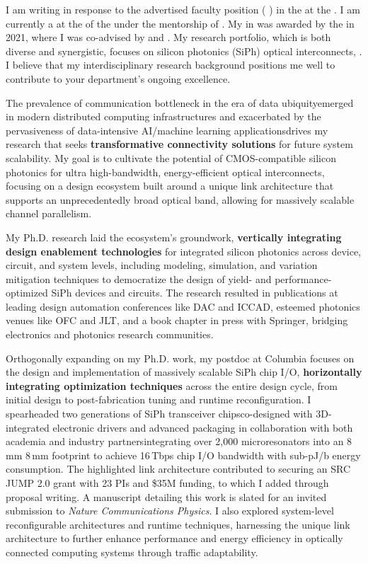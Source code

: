 I am writing in response to the advertised faculty position (\textbf{\appPosition{} \appJobID}) in the \appDept{} at the \appSchool{}. I am currently a \myTitle{} at the \myDept{} of the \mySchoolShort{} under the mentorship of \mySuper{}. My \myDegree{} in \myMajor{} was awarded by the \myPhDSchool{} in 2021, where I was co-advised by \myAdvisor{} and \myCoAdvisor{}. My research portfolio, which is both diverse and synergistic, focuses on silicon photonics (SiPh) optical interconnects, \appSpecific{}. I believe that my interdisciplinary research background positions me well to contribute to your department's ongoing excellence.

The prevalence of communication bottleneck in the era of data ubiquity\textemdash emerged in modern distributed computing infrastructures and exacerbated by the pervasiveness of data-intensive AI/machine learning applications\textemdash drives my research that seeks \textbf{transformative connectivity solutions} for future system scalability. My goal is to cultivate the potential of CMOS-compatible silicon photonics for ultra high-bandwidth, energy-efficient optical interconnects, focusing on a design ecosystem built around a unique link architecture that supports an unprecedentedly broad optical band, allowing for massively scalable channel parallelism.

My Ph.D. research laid the ecosystem's groundwork, \textbf{vertically integrating design enablement technologies} for integrated silicon photonics across device, circuit, and system levels, including modeling, simulation, and variation mitigation techniques to democratize the design of yield- and performance-optimized SiPh devices and circuits. The research resulted in publications at leading design automation conferences like DAC and ICCAD, esteemed photonics venues like OFC and JLT, and a book chapter in press with Springer, bridging electronics and photonics research communities.

Orthogonally expanding on my Ph.D. work, my postdoc at Columbia focuses on the design and implementation of massively scalable SiPh chip I/O, \textbf{horizontally integrating optimization techniques} across the entire design cycle, from initial design to post-fabrication tuning and runtime reconfiguration. I spearheaded two generations of SiPh transceiver chips\textemdash co-designed with 3D-integrated electronic drivers and advanced packaging in collaboration with both academia and industry partners\textemdash integrating over 2,000 microresonators into an 8\,mm \texttimes{} 8\,mm footprint to achieve 16\,Tbps chip I/O bandwidth with sub-pJ/b energy consumption. The highlighted link architecture contributed to securing an SRC JUMP 2.0 grant with 23 PIs and \$35M funding, to which I added through proposal writing. A manuscript detailing this work is slated for an invited submission to \emph{Nature Communications Physics}. I also explored system-level reconfigurable architectures and runtime techniques, harnessing the unique link architecture to further enhance performance and energy efficiency in optically connected computing systems through traffic adaptability.

